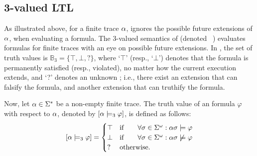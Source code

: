 % 
% 

\subsection{3-valued LTL}
\label{sec:ltl3}

As illustrated above, for a finite trace $\alpha$, \FLTL ignores the 
possible future extensions of $\alpha$, when evaluating a formula. The 
3-valued semantics of \LTL (denoted \LTLtri~\cite{bls11}) evaluates \LTL 
formulas for finite traces with an eye on possible future extensions. In 
\LTLtri, the set of truth values is $\mathbb{B}_3=\{\top,\bot, ?\}$, where 
`$\top$' (resp., `$\bot$') denotes that the formula is permanently satisfied 
(resp., violated), no matter how the 
current execution extends, and `?' denotes an unknown \truthvalue; i.e., there exist 
an extension that can falsify the formula, and another extension that can 
truthify the formula.
%

Now, let $\alpha \in \Sigma^{*}$ be a non-empty finite trace. The truth 
value 
of an \LTLtri formula $\varphi$ with respect to $\alpha$, denoted by 
$[\alpha \models_3 \varphi]$, is defined as follows:
 \begin{equation*}
 	\left[\alpha \models_3 \varphi \right] = 
 		\begin{cases} \top & \text{if }~~~~~\forall \sigma \in 
\Sigma^\omega : \alpha\sigma \models \varphi\\
 		\bot & \text{if }~~~~~\forall \sigma \in \Sigma^\omega : 
\alpha\sigma \not \models \varphi\\
 		? & \text{otherwise}.
 	\end{cases}
 \end{equation*}



